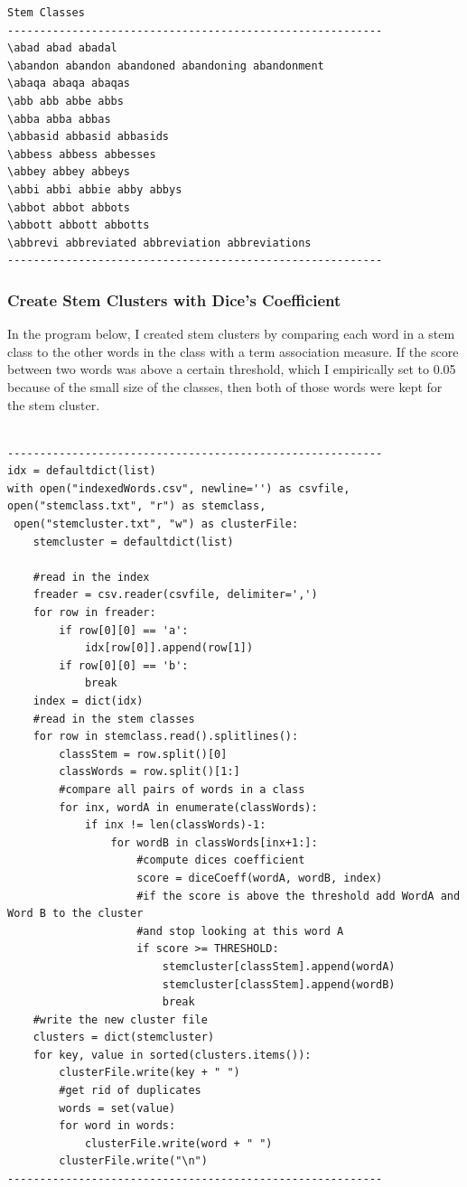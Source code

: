 \documentclass[letterpaper,12pt]{article}
\begin{document}
\begin{lstlisting}[breaklines]
                  Stem Classes
----------------------------------------------------------
\abad abad abadal 
\abandon abandon abandoned abandoning abandonment 
\abaqa abaqa abaqas 
\abb abb abbe abbs 
\abba abba abbas 
\abbasid abbasid abbasids 
\abbess abbess abbesses 
\abbey abbey abbeys 
\abbi abbi abbie abby abbys 
\abbot abbot abbots 
\abbott abbott abbotts 
\abbrevi abbreviated abbreviation abbreviations 
----------------------------------------------------------
\end{lstlisting}

\subsubsection{Create Stem Clusters with Dice's Coefficient}

In the program below, I created stem clusters by comparing each word in a stem class to the other words in the class with a term association measure. If the score between two words was above a certain threshold, which I empirically set to 0.05 because of the small size of the classes, then both of those words were kept for the stem cluster.

\begin{lstlisting}[breaklines]

----------------------------------------------------------
idx = defaultdict(list)
with open("indexedWords.csv", newline='') as csvfile, 
open("stemclass.txt", "r") as stemclass,
 open("stemcluster.txt", "w") as clusterFile:
    stemcluster = defaultdict(list)

    #read in the index
    freader = csv.reader(csvfile, delimiter=',')
    for row in freader:
        if row[0][0] == 'a':
            idx[row[0]].append(row[1])
        if row[0][0] == 'b':
            break
    index = dict(idx)
    #read in the stem classes
    for row in stemclass.read().splitlines():
        classStem = row.split()[0]
        classWords = row.split()[1:]
        #compare all pairs of words in a class
        for inx, wordA in enumerate(classWords):
            if inx != len(classWords)-1:
                for wordB in classWords[inx+1:]:
                    #compute dices coefficient
                    score = diceCoeff(wordA, wordB, index)
                    #if the score is above the threshold add WordA and Word B to the cluster
                    #and stop looking at this word A
                    if score >= THRESHOLD:
                        stemcluster[classStem].append(wordA)
                        stemcluster[classStem].append(wordB)
                        break
    #write the new cluster file
    clusters = dict(stemcluster)
    for key, value in sorted(clusters.items()):
        clusterFile.write(key + " ")
        #get rid of duplicates
        words = set(value)
        for word in words:
            clusterFile.write(word + " ")
        clusterFile.write("\n")
----------------------------------------------------------
\end{lstlisting}
\end{document}
